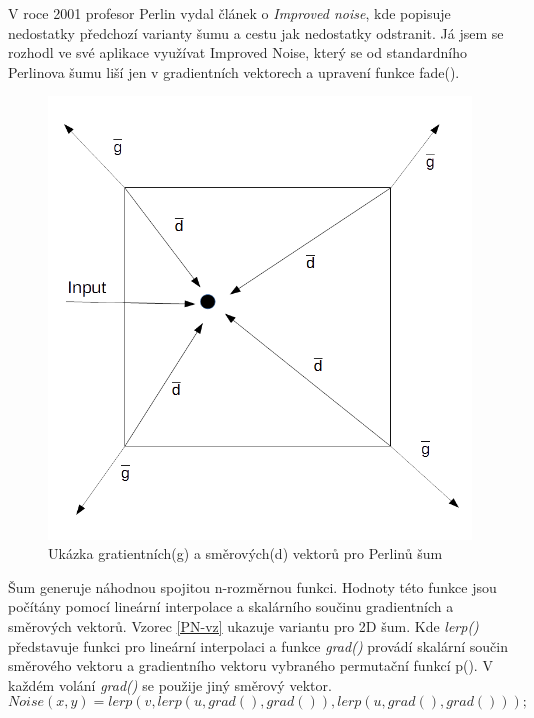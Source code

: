 V roce 2001 profesor Perlin vydal článek o \emph{Improved noise}\cite{KP-new}, kde popisuje nedostatky předchozí varianty šumu a cestu jak nedostatky odstranit. Já jsem se rozhodl ve své aplikace využívat Improved Noise, který se od standardního Perlinova šumu liší jen v  gradientních vektorech a upravení funkce fade().
\begin{figure}
	\begin{center}
	\includegraphics[scale=0.25]{obrazky-figures/PN}
		\caption{Ukázka gratientních(g) a směrových(d) vektorů pro Perlinů šum}\label{aiAnimation}
\end{center}\end{figure}
Šum generuje náhodnou spojitou n-rozměrnou funkci. Hodnoty této funkce jsou počítány pomocí lineární interpolace a skalárního součinu gradientních a směrových vektorů. Vzorec \ref{PN-vz} ukazuje variantu pro 2D šum.
Kde \emph{lerp()} představuje funkci pro lineární interpolaci a funkce \emph{grad()}  provádí skalární součin směrového vektoru a gradientního vektoru vybraného permutační funkcí p(). V každém volání \emph{grad()} se použije jiný směrový vektor. 
\begin{equation}\label{PN-vz}
Noise(x,y) = lerp(v,lerp(u,grad(),grad()),lerp(u,grad(),grad()));
\end{equation}
